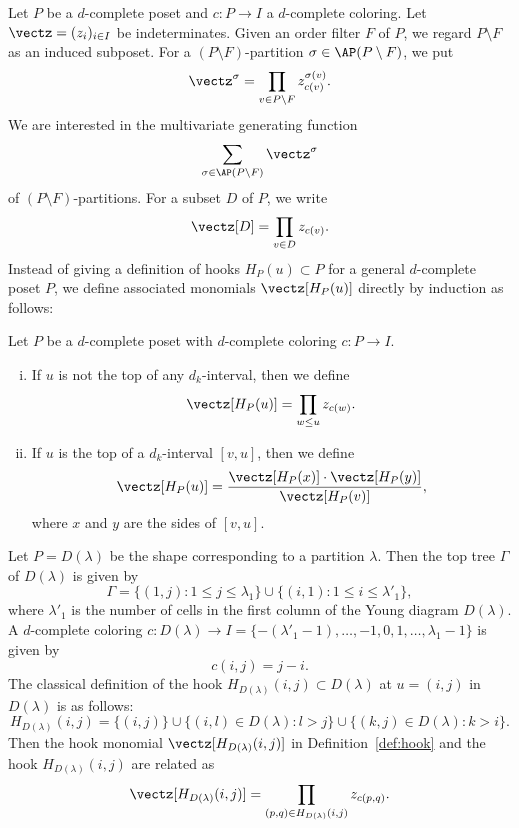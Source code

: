 Let $P$ be a $d$-complete poset and 
$c : P \to I$ a $d$-complete coloring.
Let $\vectz = (z_i)_{i \in I}$ be indeterminates.
Given an order filter $F$ of $P$, we regard $P \setminus F$ as an induced subposet.
For a $(P \setminus F)$-partition $\sigma \in \AP(P \setminus F)$, we put
$$
\vectz^\sigma = \prod_{v \in P \setminus F} z_{c(v)}^{\sigma(v)}.
$$
We are interested in the multivariate generating function
$$
\sum_{\sigma \in \AP(P \setminus F)} \vectz^\sigma
$$
of $(P \setminus F)$-partitions.
For a subset $D$ of $P$, we write
$$
\vectz[D] = \prod_{v \in D} z_{c(v)}.
$$
Instead of giving a definition of hooks $H_P(u) \subset P$ for a general 
$d$-complete poset $P$, we define associated monomials $\vectz[H_P(u)]$ 
directly by induction as follows:

\begin{defi}
\label{def:hook}
Let $P$ be a $d$-complete poset with $d$-complete coloring $c : P \to I$.
\begin{enumerate}[(i)]
\item\label{defi2.6_i} %
If $u$ is not the top of any $d_k$-interval, then we define
$$
\vectz[H_P(u)] = \prod_{w \le u} z_{c(w)}.
$$
\item\label{defi2.6_ii} %
If $u$ is the top of a $d_k$-interval $[v,u]$, then we define
$$
\vectz[H_P(u)]
 =
\frac{ \vectz[H_P(x)] \cdot \vectz[H_P(y)] }
 { \vectz[H_P(v)] },
$$
where $x$ and $y$ are the sides of $[v,u]$.
\end{enumerate}
\end{defi}

\begin{exam}
\label{ex:shape_hc}
Let $P = D(\lambda)$ be the shape corresponding to a partition $\lambda$.
Then the top tree $\Gamma$ of $D(\lambda)$ is given by
$$
\Gamma = \{ (1,j) : 1 \le j \le \lambda_1 \} \cup \{ (i,1) : 1 \le i \le \lambda'_1 \},
$$
where $\lambda'_1$ is the number of cells in the first column of the Young diagram $D(\lambda)$.
A $d$-complete coloring $c: D(\lambda) \to I = \{ -(\lambda'_1-1), \dots, -1, 0, 1, \dots, \lambda_1-1 \}$ 
is given by
$$
c(i,j) = j-i.
$$
The classical definition of the hook $H_{D(\lambda)}(i,j) \subset D(\lambda)$ 
at $u = (i,j)$ in $D(\lambda)$ is as follows:
$$
H_{D(\lambda)}(i,j)
 =
\{ (i,j) \}
\cup
\{ (i,l) \in D(\lambda) : l > j \}
\cup
\{ (k,j) \in D(\lambda) : k > i \}.
$$
Then the hook monomial $\vectz[H_{D(\lambda)}(i,j)]$ in Definition~\ref{def:hook} 
and the hook $H_{D(\lambda)}(i,j)$ are related as 
$$
\vectz[H_{D(\lambda)}(i,j)]
 =
\prod_{(p,q)\in H_{D(\lambda)}(i,j) } z_{c(p,q)}.
$$
\end{exam}

